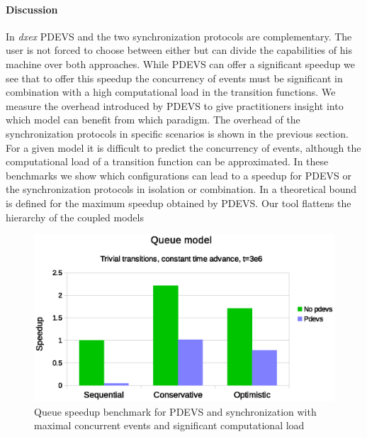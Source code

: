 \paragraph{Discussion}
In \textit{dxex} PDEVS and the two synchronization protocols are complementary. The user is not forced to choose between either but can divide the capabilities of his machine over both approaches.
While PDEVS can offer a significant speedup we see that to offer this speedup the concurrency of events must be significant in combination with a high computational load in the transition functions. 
We measure the overhead introduced by PDEVS to give practitioners insight into which model can benefit from which paradigm.
The overhead of the synchronization protocols in specific scenarios  is shown in the previous section.
For a given model it is difficult to predict the concurrency of events, although the computational load of a transition function can be approximated.
In these benchmarks we show which configurations can lead to a speedup for PDEVS or the synchronization protocols in isolation or combination.
In \citep{amdahlpdevs} a theoretical bound is defined for the maximum speedup obtained by PDEVS. 
Our tool flattens the hierarchy of the coupled models


\begin{figure}
	\center
	\includegraphics[width=\columnwidth]{fig/pdevs_fixed_sleep.eps}
	\caption{Queue speedup benchmark for PDEVS and synchronization with maximal concurrent events and significant computational load}
	\label{fig:pdevs_plot_fixed_sleep}
\end{figure}

